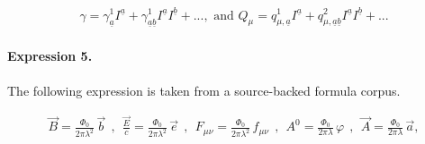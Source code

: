 \documentclass[11pt]{article}
\begin{document}
\begin{align*}\gamma = \gamma _{\underline{a}}^1I^{\underline{a}}+\gamma _{\underline{a} \underline{b}}^1I^{\underline{a}}I^{\underline{b}}+..., \text{ and } Q_\mu = q_{\mu ,\underline{a}}^1I^{\underline{a}}+q_{\mu ,\underline{a} \underline{b}}^2I^{\underline{a}}I^{\underline{b}}+...\end{align*}

\paragraph{Expression 5.} The following expression is taken from a source-backed formula corpus.

\begin{align*}\vec{B}=\frac{\Phi_0}{2\pi\lambda^2}\,\vec{b}\ \ ,\ \ \frac{\vec{E}}{c}=\frac{\Phi_0}{2\pi\lambda^2}\,\vec{e}\ \ ,\ \ F_{\mu\nu}=\frac{\Phi_0}{2\pi\lambda^2}\,f_{\mu\nu}\ \ ,\ \ A^0=\frac{\Phi_0}{2\pi\lambda}\,\varphi\ \ ,\ \ \vec{A}=\frac{\Phi_0}{2\pi\lambda}\,\vec{a},\end{align*}
\end{document}
